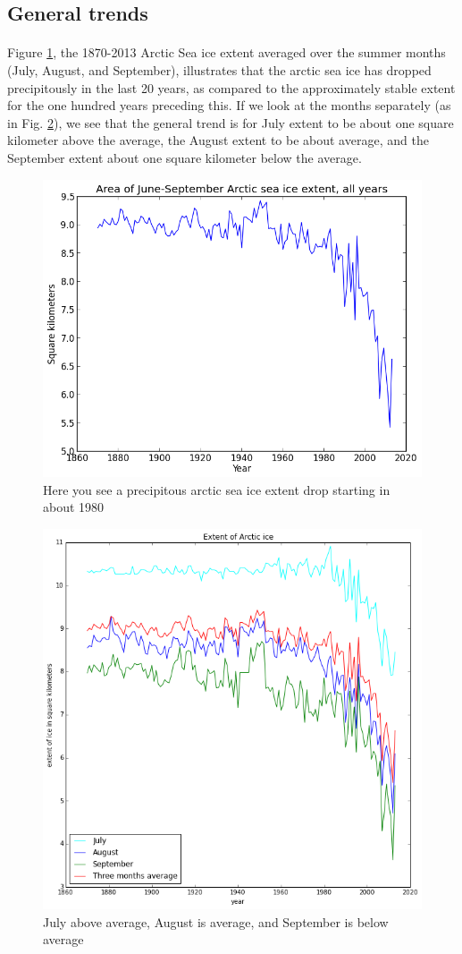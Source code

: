 \documentclass[12pt,a4paper]{article} %
\begin{document}
\subsection{General trends}
\paragraph{}
Figure \ref{avg_area_annual}, the 1870-2013 Arctic Sea ice extent averaged over the summer months (July, August, and September), illustrates that the arctic sea ice has dropped precipitously in the last 20 years, as compared to the approximately stable extent for the one hundred years preceding this. If we look at the months separately (as in Fig. \ref{months}), we see that the general trend is for July extent to be about one square kilometer above the average, the August extent to be about average, and the September extent about one square kilometer below the average.  

\begin{figure}[hbp]
\centering
 \includegraphics[width=0.75\linewidth]{../output/avg_area_annual.png}
\caption{Here you see a precipitous arctic sea ice extent drop starting in about 1980}
\label{avg_area_annual}
\end{figure}

\begin{figure}[hbp]
\centering
 \includegraphics[width=0.75\linewidth]{../img/iceExt.png}
\caption{July above average, August is average, and September is below average}
\label{months}
\end{figure}
\end{document}
